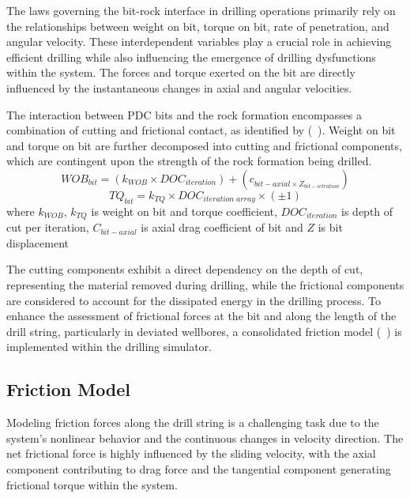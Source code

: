 The laws governing the bit-rock interface in drilling operations primarily rely on the relationships between weight on bit, torque on bit, rate of penetration, and angular velocity. These interdependent variables play a crucial role in achieving efficient drilling while also influencing the emergence of drilling dysfunctions within the system. The forces and torque exerted on the bit are directly influenced by the instantaneous changes in axial and angular velocities.

The interaction between PDC bits and the rock formation encompasses a combination of cutting and frictional contact, as identified by (~\cite{ref:detournay1992a}). Weight on bit and torque on bit are further decomposed into cutting and frictional components, which are contingent upon the strength of the rock formation being drilled.
\begin{equation}\label{WOB}
  WOB_{bit} = (k_{WOB}\times DOC_{iteration}) + (c_{bit-axial\times \dot{Z}_{bit-ietration}})
\end{equation}
\begin{equation}\label{Torque}
  TQ_{bit} = k_{TQ}\times DOC_{iteration\; array}\times (\pm1)
\end{equation}
where $k_{WOB}$, $k_{TQ}$ is weight on bit and torque coefficient, $DOC_{iteration}$ is depth of cut per iteration, $C_{bit-axial}$ is axial drag coefficient of bit and $Z$ is bit displacement 

The cutting components exhibit a direct dependency on the depth of cut, representing the material removed during drilling, while the frictional components are considered to account for the dissipated energy in the drilling process. To enhance the assessment of frictional forces at the bit and along the length of the drill string, particularly in deviated wellbores, a consolidated friction model (~\cite{ref:cayeux2020a}) is implemented within the drilling simulator. 

\subsection{Friction Model}

Modeling friction forces along the drill string is a challenging task due to the system's nonlinear behavior and the continuous changes in velocity direction. The net frictional force is highly influenced by the sliding velocity, with the axial component contributing to drag force and the tangential component generating frictional torque within the system.
 

